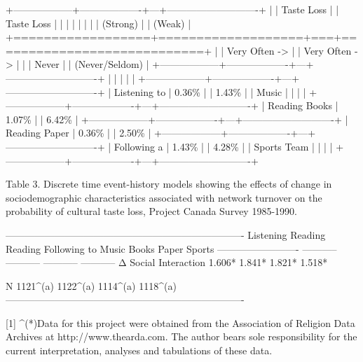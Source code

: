 +------------------+-------------------+---+----------------------------+ |                  | Taste Loss        |   | Taste Loss                 | |                  |                   |   |                            | |                  | (Strong)          |   | (Weak)                     | +==================+===================+===+============================+ |                  | Very Often ->     |   | Very Often ->              | |                  | Never             |   | (Never/Seldom)             | +------------------+-------------------+---+----------------------------+ |                  |                   |   |                            | +------------------+-------------------+---+----------------------------+ | Listening to     | 0.36\%             |   | 1.43\%                      | | Music            |                   |   |                            | +------------------+-------------------+---+----------------------------+ | Reading Books    | 1.07\%             |   | 6.42\%                      | +------------------+-------------------+---+----------------------------+ | Reading Paper    | 0.36\%             |   | 2.50\%                      | +------------------+-------------------+---+----------------------------+ | Following a      | 1.43\%             |   | 4.28\%                      | | Sports Team      |                   |   |                            | +------------------+-------------------+---+----------------------------+

Table 3. Discrete time event-history models showing the effects of change in sociodemographic characteristics associated with network turnover on the probability of cultural taste loss, Project Canada Survey 1985-1990.

-------------------------------------------------------------------------                             Listening   Reading     Reading     Following                             to Music    Books       Paper       Sports   ------------------------- ----------- ----------- ----------- -----------   Δ Social Interaction      1.606*      1.841*      1.821*      1.518*

N                         1121^(a)    1122^(a)    1114^(a)    1118^(a)   -------------------------------------------------------------------------

[1] ^(*)Data for this project were obtained from the Association of Religion Data Archives at http://www.thearda.com. The author bears sole responsibility for the current interpretation, analyses and tabulations of these data.

